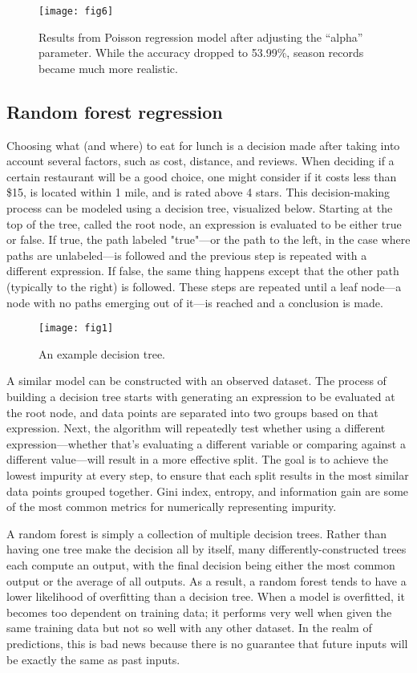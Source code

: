 \documentclass{paper}
\begin{document}
\begin{figure}[H]
  \centering
  \texttt{[image: fig6]}
  \caption{Results from Poisson regression model after adjusting the ``alpha'' parameter. While the accuracy dropped to 53.99\%, season records became much more realistic.}
\end{figure}

\subsection{Random forest regression}
Choosing what (and where) to eat for lunch is a decision made after taking into account several factors, such as cost, distance, and reviews. When deciding if a certain restaurant will be a good choice, one might consider if it costs less than \$15, is located within 1 mile, and is rated above 4 stars. This decision-making process can be modeled using a decision tree, visualized below. Starting at the top of the tree, called the root node, an expression is evaluated to be either true or false. If true, the path labeled "true"---or the path to the left, in the case where paths are unlabeled---is followed and the previous step is repeated with a different expression. If false, the same thing happens except that the other path (typically to the right) is followed. These steps are repeated until a leaf node---a node with no paths emerging out of it---is reached and a conclusion is made.

\begin{figure}[H]
  \centering
  \texttt{[image: fig1]}
  \caption{An example decision tree.}
\end{figure}

A similar model can be constructed with an observed dataset. The process of building a decision tree starts with generating an expression to be evaluated at the root node, and data points are separated into two groups based on that expression. Next, the algorithm will repeatedly test whether using a different expression---whether that's evaluating a different variable or comparing against a different value---will result in a more effective split. The goal is to achieve the lowest impurity at every step, to ensure that each split results in the most similar data points grouped together. Gini index, entropy, and information gain are some of the most common metrics for numerically representing impurity.

A random forest is simply a collection of multiple decision trees. Rather than having one tree make the decision all by itself, many differently-constructed trees each compute an output, with the final decision being either the most common output or the average of all outputs. As a result, a random forest tends to have a lower likelihood of overfitting than a decision tree. When a model is overfitted, it becomes too dependent on training data; it performs very well when given the same training data but not so well with any other dataset. In the realm of predictions, this is bad news because there is no guarantee that future inputs will be exactly the same as past inputs.
\end{document}

